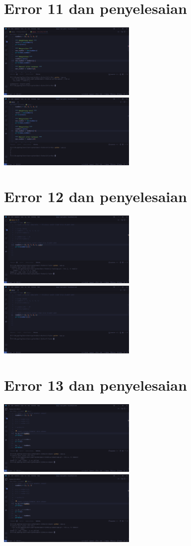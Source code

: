 \documentclass{article}
\begin{document}
\section{Error 11 dan penyelesaian}
\includegraphics[width=0.5\textwidth]{gambar/20_error.png}
\includegraphics[width=0.5\textwidth]{gambar/20_pengananan.png}

\section{Error 12 dan penyelesaian}
\includegraphics[width=0.5\textwidth]{gambar/21_error.png}
\includegraphics[width=0.5\textwidth]{gambar/21_penanganan.png}

\section{Error 13 dan penyelesaian}
\includegraphics[width=0.5\textwidth]{gambar/22_error.png}
\includegraphics[width=0.5\textwidth]{gambar/22_error.png}
\end{document}
